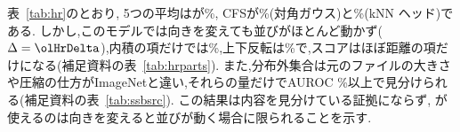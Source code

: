 表~\ref{tab:hr}のとおり, 5つの平均は\Ours{}が\olHrOL\%, CFSが\olHrCfs\%(対角ガウス)と\olHrCfsKnn\%(kNN ヘッド)である. しかし,このモデルでは向きを変えても並びがほとんど動かず($\Delta=\olHrDelta$),内積の項だけでは\olHrL\%,上下反転は\olHrOLVf\%で,スコアはほぼ距離の項だけになる(補足資料の表~\ref{tab:hrparts}). また,分布外集合は元のファイルの大きさや圧縮の仕方がImageNetと違い,それらの量だけでAUROC \olFactsMin\%以上で見分けられる(補足資料の表~\ref{tab:ssbsrc}). この結果は内容を見分けている証拠にならず, \Ours{}が使えるのは向きを変えると並びが動く場合に限られることを示す.
